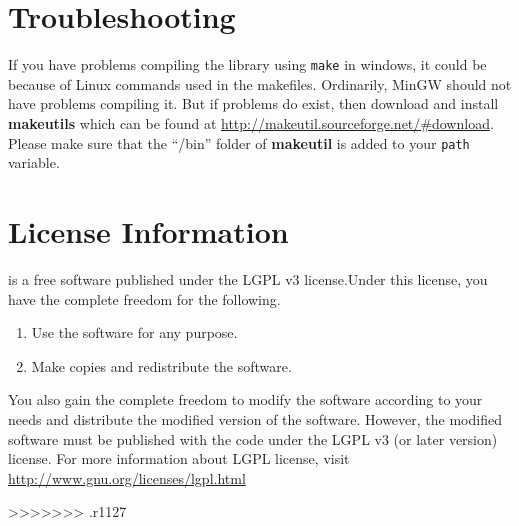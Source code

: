 \section{Troubleshooting}
If you have problems compiling the library using \texttt{make} in windows, it could be because of Linux commands used in the makefiles. Ordinarily, MinGW should not have problems compiling it. But if problems do exist, then download and install \textbf{makeutils} which can be found at \url{http://makeutil.sourceforge.net/#download}. \vskip 1pt
Please make sure that the ``/bin'' folder of \textbf{makeutil} is added to your \texttt{path} variable. 

\section{License Information}
\libalf is a free software published under the LGPL v3 license.Under this license, you have the complete freedom for the following.
\begin{enumerate}
 \item Use the software for any purpose.
 \item Make copies and redistribute the software.
\end{enumerate}
You also gain the complete freedom to modify the software according to your needs and distribute the modified version of the software. However, the modified software must be published with the code under the LGPL v3 (or later version) license. 
For more information about LGPL license, visit \url{http://www.gnu.org/licenses/lgpl.html}



>>>>>>> .r1127
